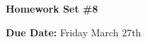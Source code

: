 
\usepackage{braket}




\usepackage{fancyhdr}
\usepackage{cancel}
\usepackage{ mathrsfs }





\fancyhf{}

\thispagestyle{fancy}






\begin{center}
{\huge \textbf{Homework Set \#8 }}
\large

{\textbf{ Due Date:} Friday March 27th  } 
\end{center}

